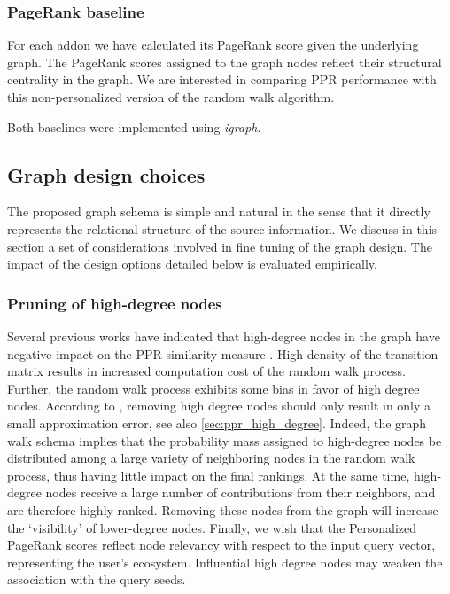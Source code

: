 \documentclass[11pt,oneside]{book}
\let\Oldsubsection\subsection
\renewcommand{\subsection}{\FloatBarrier\Oldsubsection}
\let\Oldsubsubsection\subsubsection
\renewcommand{\subsubsection}{\FloatBarrier\Oldsubsubsection}
\begin{document}
\subsubsection{PageRank baseline} 

For each addon we have calculated its PageRank score given the underlying graph. The PageRank scores assigned to the graph nodes reflect their structural centrality in the graph. We are interested in comparing PPR performance with this non-personalized version of the random walk algorithm.

Both baselines were implemented using {\it igraph}. 

\subsection{Graph design choices}
\label{sec:design}

The proposed graph schema is simple and natural in the sense that it directly represents the relational structure of the source information. We discuss in this section a set of considerations involved in fine tuning of the graph design. The impact of the design options detailed below is evaluated empirically.  

\subsubsection{Pruning of high-degree nodes} 

Several previous works have indicated that high-degree nodes in the graph have negative impact on the PPR similarity measure \citep{tong2006center}. High density of the transition matrix results in increased computation cost of the random walk process. Further, the random walk process exhibits some bias in favor of high degree nodes. According to \citep{sarkar2010fast}, removing high degree nodes should only result in only a small approximation error, see also \autoref{sec:ppr_high_degree}. Indeed, the graph walk schema implies that the probability mass assigned to high-degree nodes be distributed among a large variety of neighboring nodes in the random walk process, thus having little impact on the final rankings. At the same time, high-degree nodes receive a large number of contributions from their neighbors, and are therefore highly-ranked. Removing these nodes from the graph will increase the `visibility' of lower-degree nodes. Finally, we wish that the Personalized PageRank scores reflect node relevancy with respect to the input query vector, representing the user's ecosystem. Influential high degree nodes may weaken the association with the query seeds.
\end{document}
